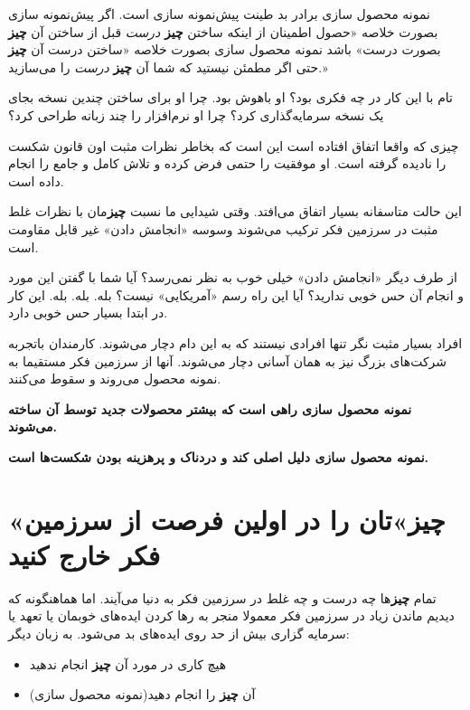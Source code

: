 نمونه محصول سازی برادر بد طینت پیش‌نمونه سازی است. اگر پیش‌نمونه سازی
بصورت خلاصه «حصول اطمینان از اینکه ساختن \textbf{چیز} \emph{درست} قبل از
ساختن آن \textbf{چیز} بصورت درست» باشد نمونه محصول سازی بصورت خلاصه
«ساختن درست آن \textbf{چیز} حتی اگر مطمئن نیستید که شما آن \textbf{چیز}
\emph{درست} را می‌سازید.»

تام با این کار در چه فکری بود؟ او باهوش بود. چرا او برای ساختن چندین
نسخه بجای یک نسخه سرمایه‌گذاری کرد؟ چرا او نرم‌افزار را چند زبانه طراحی
کرد؟

چیزی که واقعا اتفاق افتاده است این است که بخاطر نظرات مثبت اون قانون
شکست را نادیده گرفته است. او موفقیت را حتمی فرض کرده و تلاش کامل و جامع
را انجام داده است.

این حالت متاسفانه بسیار اتفاق می‌افتد. وقتی شیدایی ما نسبت
\textbf{چیز}مان با نظرات غلط مثبت در سرزمین فکر ترکیب می‌شوند وسوسه
«انجامش دادن» غیر قابل مقاومت است.

از طرف دیگر «انجامش دادن» خیلی خوب به نظر نمی‌رسد؟ آیا شما با گفتن این
مورد و انجام آن حس خوبی ندارید؟ آیا این راه رسم «آمریکایی» نیست؟ بله.
بله. بله. این کار در ابتدا بسیار حس خوبی دارد.

افراد بسیار مثبت نگر تنها افرادی نیستند که به این دام دچار می‌شوند.
کارمندان باتجربه شرکت‌های بزرگ نیز به همان آسانی دچار می‌شوند. آنها از
سرزمین فکر مستقیما به نمونه محصول می‌روند و سقوط می‌کنند.

\textbf{نمونه محصول سازی راهی است که بیشتر محصولات جدید توسط آن ساخته
می‌شوند.}

\textbf{نمونه محصول سازی دلیل اصلی کند و دردناک و پرهزینه بودن شکست‌ها
است.}

\section{«چیز»تان را در اولین فرصت از سرزمین فکر خارج
کنید}\label{ux686ux6ccux632ux62aux627ux646-ux631ux627-ux62fux631-ux627ux648ux644ux6ccux646-ux641ux631ux635ux62a-ux627ux632-ux633ux631ux632ux645ux6ccux646-ux641ux6a9ux631-ux62eux627ux631ux62c-ux6a9ux646ux6ccux62f}

تمام \textbf{چیز}ها چه درست و چه غلط در سرزمین فکر به دنیا می‌آیند. اما
هماهنگونه که دیدیم ماندن زیاد در سرزمین فکر معمولا منجر به رها کردن
ایده‌های خوبمان یا تعهد یا سرمایه گزاری بیش از حد روی ایده‌های بد
می‌شود. به زبان دیگر:

\begin{itemize}

\item
  هیچ کاری در مورد آن \textbf{چیز} انجام ندهید
\item
  آن \textbf{چیز} را انجام دهید(نمونه محصول سازی)
\end{itemize}

